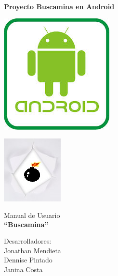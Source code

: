 

\vspace*{\fill}
\textbf{Proyecto Buscamina en Android}
\vspace{5em}
\begin{center}
	\includegraphics[scale=0.5]{image_buscamina/android.jpg} 
\end{center}
	
\vspace*{\fill}


\newpage 
	
\vspace*{\fill}
\begin{center}
		
                        \includegraphics[scale=1.5]{image_buscamina/papel_hueco.jpg} 
	\end{center}
	
			\begin{center}
				Manual de Usuario \\
				\vspace{5em}
				\Huge{\textbf{``Buscamina''	\vspace{3em}}}
			\end{center}	
			
			


				\hspace*{5cm}Desarrolladores:
				\vspace{1.5em}
				\\\hspace*{8cm}Jonathan Mendieta
				\\\hspace*{8cm}Dennise Pintado
				\\\hspace*{8cm}Janina Costa


